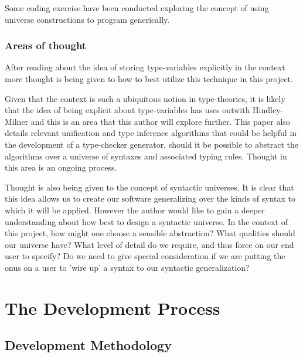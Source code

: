 \documentclass{ProgressReport}[2020/09/15]
\begin{document}
          Some coding exercise have been conducted exploring the
          concept of using universe constructions to program generically.
        
          \subsection{Areas of thought}

          After reading about the idea of storing type-variables
          explicitly in the context \cite{TypeInferenceInContext} more
          thought is being given to how to best utilize this technique
          in this project.
          
          Given that the context is such a ubiquitous notion in
          type-theories, it is likely that the idea of being
          explicit about type-variables has uses outwith
          Hindley-Milner and this is an area that this author will explore
          further. This paper also details relevant unification and type
          inference algorithms that could be helpful in the
          development of a type-checker generator, should it be
          possible to abstract the algorithms over a universe of
          syntaxes and associated typing rules. Thought in this area
          is an ongoing process.

          Thought is also being given to the concept of syntactic
          universes. It is clear that this idea allows us to create
          our software generalizing over the kinds of syntax to which it
          will be applied. However the author would like to gain a
          deeper understanding about how best to design a syntactic
          universe. In the context of this project, how might one
          choose a sensible abstraction? What qualities should our
          universe have? What level of detail do we require, and thus
          force on our end user to specify? Do we need to give
          special consideration if we are putting the onus on a user
          to 'wire up' a syntax to our syntactic generalization?
          
        \chapter{The Development Process}
        \section{Development Methodology}
\end{document}
